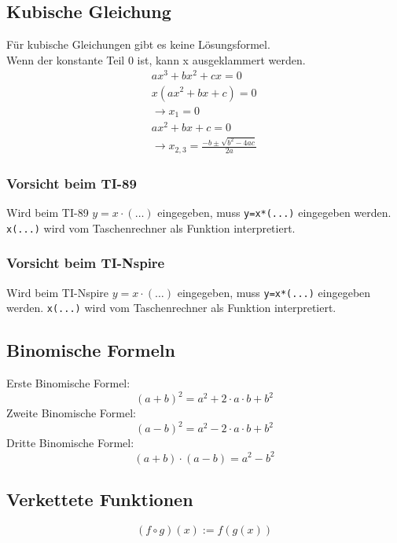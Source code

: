 \subsection{Kubische Gleichung}
Für kubische Gleichungen gibt es keine Lösungsformel. \\
Wenn der konstante Teil 0 ist, kann x ausgeklammert werden. 
\[ \boxed{\begin{array}{l}
ax^3 + bx^2 + cx = 0 \\
x(ax^2 + bx + c) = 0 \\
\rightarrow x_1 = 0 \\
ax^2 + bx + c = 0 \\
\rightarrow x_{2,3} = \frac{-b\pm\sqrt{b^2-4ac}}{2a}
\end{array}} \]

\ifti
\subsubsection{Vorsicht beim TI-89}
Wird beim TI-89 $y = x \cdot (\ldots)$ eingegeben, muss \verb!y=x*(...)! 
eingegeben werden. \verb!x(...)! wird vom Taschenrechner als Funktion 
interpretiert. 
\fi

\ifnspire
\subsubsection{Vorsicht beim TI-Nspire}
Wird beim TI-Nspire $y = x \cdot (\ldots)$ eingegeben, muss \verb!y=x*(...)! 
eingegeben werden. \verb!x(...)! wird vom Taschenrechner als Funktion 
interpretiert. 
\fi

\subsection{Binomische Formeln}
Erste Binomische Formel: 
\[ \boxed{(a + b)^2 = a^2 + 2 \cdot a \cdot b + b^2} \]Zweite Binomische Formel: 
\[ \boxed{(a - b)^2 = a^2 - 2 \cdot a \cdot b + b^2} \]Dritte Binomische Formel: 
\[ \boxed{(a + b) \cdot (a - b) = a^2 - b^2} \]

\subsection{Verkettete Funktionen}
\[ \boxed{(f \circ g)(x) := f(g(x))} \]

